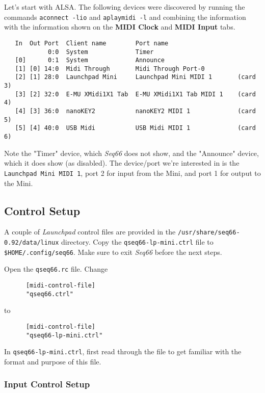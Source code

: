    Let's start with ALSA.  The following devices were discovered by running the
   commands \texttt{aconnect -lio} and \texttt{aplaymidi -l} and combining the
   information with the information shown on the
   \textbf{MIDI Clock} and \textbf{MIDI Input} tabs.

   \begin{verbatim}
   In  Out Port  Client name        Port name
            0:0  System             Timer
   [0]      0:1  System             Announce
   [1] [0] 14:0  Midi Through       Midi Through Port-0
   [2] [1] 28:0  Launchpad Mini     Launchpad Mini MIDI 1       (card 3)
   [3] [2] 32:0  E-MU XMidi1X1 Tab  E-MU XMidi1X1 Tab MIDI 1    (card 4)
   [4] [3] 36:0  nanoKEY2           nanoKEY2 MIDI 1             (card 5)
   [5] [4] 40:0  USB Midi           USB Midi MIDI 1             (card 6)
   \end{verbatim}

   Note the "Timer" device, which \textsl{Seq66} does not show, and the
   "Announce" device, which it does show (as disabled).  The device/port we're
   interested in is the \texttt{Launchpad Mini MIDI 1}, port 2 for input from the
   Mini, and port 1 for output to the Mini.

\subsection{Control Setup}
\label{subsec:launchpad_mini_control_setup}

   A couple of \textsl{Launchpad} control files are provided in the
   \texttt{/usr/share/seq66-0.92/data/linux} directory.
   Copy the \texttt{qseq66-lp-mini.ctrl} file to
   \texttt{\$HOME/.config/seq66}.
   Make sure to exit \textsl{Seq66} before the next steps.

   Open the \texttt{qseq66.rc} file.  Change

   \begin{verbatim}
      [midi-control-file]
      "qseq66.ctrl"
   \end{verbatim}

   to

   \begin{verbatim}
      [midi-control-file]
      "qseq66-lp-mini.ctrl"
   \end{verbatim}

   In \texttt{qseq66-lp-mini.ctrl}, first read through the file to get familiar
   with the format and purpose of this file.

\subsubsection{Input Control Setup}
\label{subsubsec:launchpad_mini_input_control_setup}

